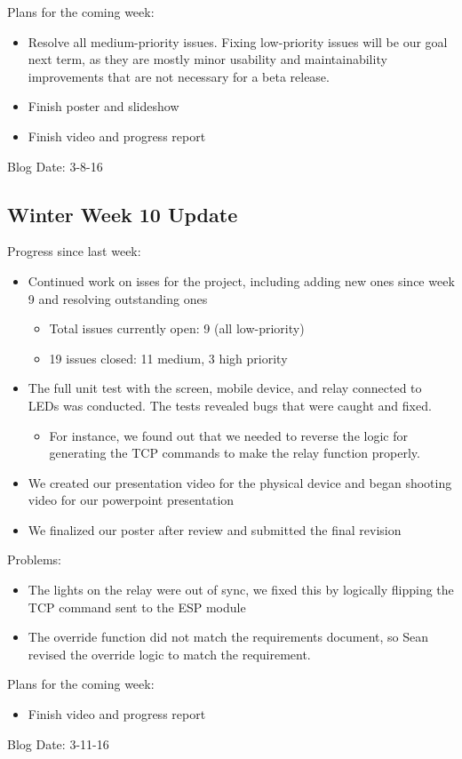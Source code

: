 Plans for the coming week:
\begin{itemize}
   \item Resolve all medium-priority issues.  Fixing low-priority issues will be our goal next term, as they are mostly minor usability and maintainability improvements that are not necessary for a beta release.
   \item Finish poster and slideshow
   \item Finish video and progress report
\end{itemize}
Blog Date: 3-8-16

\subsection{Winter Week 10 Update}
Progress since last week:
\begin{itemize}
   \item Continued work on isses for the project, including adding new ones since week 9 and resolving outstanding ones
      \begin{itemize}
         \item Total issues currently open: 9 (all low-priority)
         \item 19 issues closed: 11 medium, 3 high priority
      \end{itemize}
   \item The full unit test with the screen, mobile device, and relay connected to LEDs was conducted. The tests revealed bugs that were caught and fixed.
      \begin{itemize}
         \item For instance, we found out that we needed to reverse the logic for generating the TCP commands to make the relay function properly.
      \end{itemize}
   \item We created our presentation video for the physical device and began shooting video for our powerpoint presentation
   \item We finalized our poster after review and submitted the final revision
\end{itemize}
Problems:
\begin{itemize}
   \item The lights on the relay were out of sync, we fixed this by logically flipping the TCP command sent to the ESP module
   \item The override function did not match the requirements document, so Sean revised the override logic to match the requirement.
\end{itemize}
Plans for the coming week:
\begin{itemize}
   \item Finish video and progress report
\end{itemize}
Blog Date: 3-11-16

